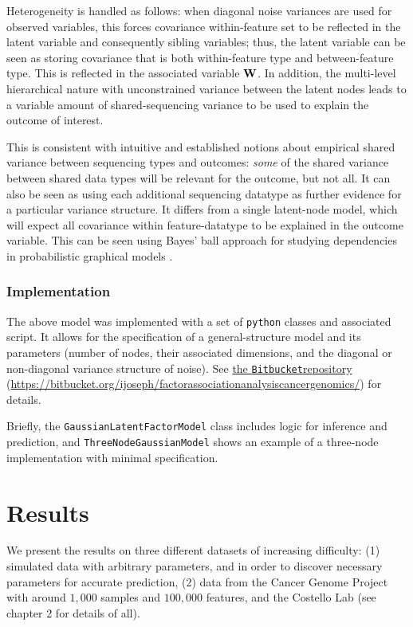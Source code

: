 Heterogeneity is handled as follows: when diagonal noise variances are used for observed variables, this forces covariance within-feature set to be reflected in the latent variable and consequently sibling variables; thus, the latent variable can be seen as storing covariance that is both within-feature type and between-feature type. This is reflected in the associated variable $\bold{W}$. In addition, the multi-level hierarchical nature with unconstrained variance between the latent nodes leads to a variable amount of shared-sequencing variance to be used to explain the outcome of interest.

This is consistent with intuitive and established notions about empirical shared variance between sequencing types and outcomes: \textit{some} of the shared variance between shared data types will be relevant for the outcome, but not all. It can also be seen as using each additional sequencing datatype as further evidence for a particular variance structure. It differs from a single latent-node model, which will expect all covariance within feature-datatype to be explained in the outcome variable. This  can be seen using Bayes' ball approach for studying dependencies in probabilistic graphical models .


\subsubsection{Implementation}

The above model was implemented with a set of \texttt{python} classes and associated script. It allows for the specification of a general-structure model and its parameters (number of nodes, their associated dimensions, and the diagonal or non-diagonal variance structure of noise). See \href{https://bitbucket.org/ijoseph/factorassociationanalysiscancergenomics/}{the \texttt{Bitbucket}\reg repository} \\ (\url{https://bitbucket.org/ijoseph/factorassociationanalysiscancergenomics/}) for details.

Briefly, the \texttt{GaussianLatentFactorModel} class includes logic for inference and prediction, and \texttt{ThreeNodeGaussianModel} shows an example of a three-node implementation with minimal specification.

\section{Results}
We present the results on three different datasets of increasing difficulty: (1) simulated data with arbitrary parameters, and in order to discover necessary parameters for accurate prediction, (2) data from the Cancer Genome Project\cite{ledford_end_2015} with around $1,000$ samples and $100,000$ features, and the Costello Lab (see chapter 2 for details of all).

